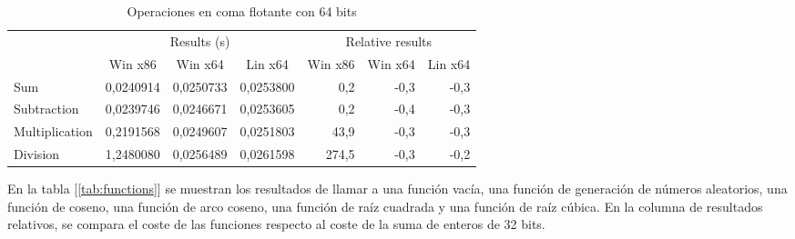 \begin{table}[h]
\centering
\begin{tabular}{@{}l|rrr|rrr|@{}}
\cmidrule(l){2-7}
                                     & \multicolumn{3}{c|}{Results (s)}                                                               & \multicolumn{3}{c|}{Relative results}                                                      \\ \cmidrule(l){2-7} 
                                     & \multicolumn{1}{c|}{Win x86} & \multicolumn{1}{c|}{Win x64} & \multicolumn{1}{c|}{Lin x64} & \multicolumn{1}{c|}{Win x86} & \multicolumn{1}{c|}{Win x64} & \multicolumn{1}{c|}{Lin x64} \\ \midrule
\multicolumn{1}{|l|}{Sum}            & 0,0240914                    & 0,0250733                    & 0,0253800                    & 0,2                          & -0,3                         & -0,3                         \\ \cmidrule(r){1-1}
\multicolumn{1}{|l|}{Subtraction}    & 0,0239746                    & 0,0246671                    & 0,0253605                    & 0,2                          & -0,4                         & -0,3                         \\ \cmidrule(r){1-1}
\multicolumn{1}{|l|}{Multiplication} & 0,2191568                    & 0,0249607                    & 0,0251803                    & 43,9                         & -0,3                         & -0,3                         \\ \cmidrule(r){1-1}
\multicolumn{1}{|l|}{Division}       & 1,2480080                    & 0,0256489                    & 0,0261598                    & 274,5                        & -0,3                         & -0,2                         \\ \bottomrule
\end{tabular}
\caption{Operaciones en coma flotante con 64 bits}
\label{tab:float64}
\end{table}

En la tabla [\ref{tab:functions}] se muestran los resultados de llamar a una función vacía, una función de generación de números aleatorios, una función de coseno, una función de arco coseno, una función de raíz cuadrada y una función de raíz cúbica. En la columna de resultados relativos, se compara el coste de las funciones respecto al coste de la suma de enteros de 32 bits.\\


